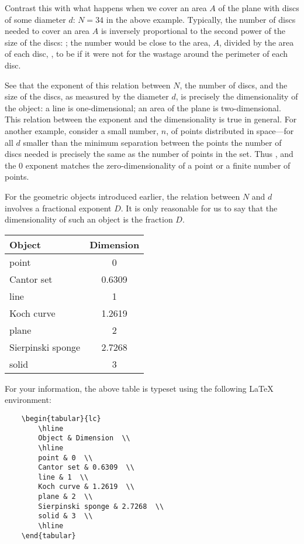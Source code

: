 \documentclass[12pt,a5paper]{article}
\begin{document}
Contrast this with what happens when we cover an area $A$ of the plane 
with discs of some diameter $d$: 
\(
	N=34
\)
 in the above example.  Typically, 
the number of discs needed to cover an area 
\(
	A
\)
 is inversely 
proportional to the second power of the size of the discs: ;  the 
number would be close to the area, $A$, divided by the area of each 
disc, , to be  if it were not for the wastage around the perimeter 
of each disc.  

See that the exponent of this relation between $N$, the number of 
discs, and the size of the discs, as measured by the diameter $d$, is 
precisely the dimensionality of the object:  a line is 
one-dimensional;  an area of the plane is two-dimensional.  This 
relation between the exponent and the dimensionality is true in 
general.  For another example, consider a small number, $n$, of points 
distributed in space---for all 
\(
	d
\)
 smaller than the minimum separation 
between the points the number of discs needed is precisely the same 
as the number of points in the set.  Thus  , and the 0 exponent 
matches the zero-dimensionality of a point or a finite number of 
points.  

For the geometric objects introduced earlier, the relation between $
N$ and $d$ involves a fractional exponent $D$.  It is only 
reasonable for us to say that the dimensionality of such an object is 
the fraction $D$.
\begin{center}
	\begin{tabular}{lc}
		\hline
		Object & Dimension  \\
		\hline
		point & 0  \\
		Cantor set & 0.6309  \\
		line & 1  \\
		Koch curve & 1.2619  \\
		plane & 2  \\
		Sierpinski sponge & 2.7268  \\
		solid & 3  \\
		\hline
	\end{tabular}
\end{center}
For your information, the above table is typeset using the following 
LaTeX environment:
\begin{verbatim}
	\begin{tabular}{lc}
		\hline
		Object & Dimension  \\
		\hline
		point & 0  \\
		Cantor set & 0.6309  \\
		line & 1  \\
		Koch curve & 1.2619  \\
		plane & 2  \\
		Sierpinski sponge & 2.7268  \\
		solid & 3  \\
		\hline
	\end{tabular}
\end{verbatim}
\end{document}
